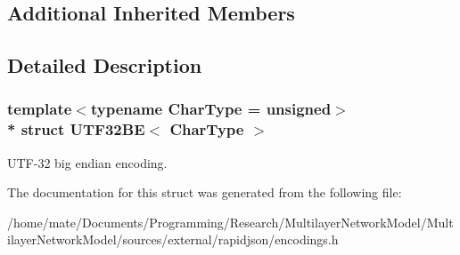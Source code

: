\subsection*{Additional Inherited Members}


\subsection{Detailed Description}
\subsubsection*{template$<$typename Char\+Type = unsigned$>$\\*
struct U\+T\+F32\+B\+E$<$ Char\+Type $>$}

U\+T\+F-\/32 big endian encoding. 

The documentation for this struct was generated from the following file\+:\begin{DoxyCompactItemize}
\item 
/home/mate/\+Documents/\+Programming/\+Research/\+Multilayer\+Network\+Model/\+Multilayer\+Network\+Model/sources/external/rapidjson/encodings.\+h\end{DoxyCompactItemize}
